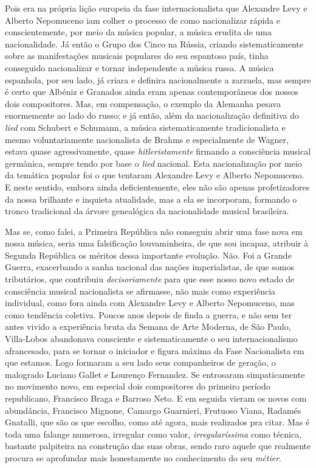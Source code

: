 Pois era na própria lição europeia da fase internacionalista que
Alexandre Levy e Alberto Nepomuceno iam colher o processo de como
nacionalizar rápida e conscientemente, por meio da música popular, a
música erudita de uma nacionalidade. Já então o Grupo dos Cinco na
Rússia, criando sistematicamente sobre as manifestações musicais
populares do seu espantoso país, tinha conseguido nacionalizar e tornar
independente a música russa. A música espanhola, por seu lado, já criara
e definira nacionalmente a zarzuela, mas sempre é certo que Albéniz e
Granados ainda eram apenas contemporâneos dos nossos dois compositores.
Mas, em compensação, o exemplo da Alemanha pesava enormemente ao lado do
russo; e já então, além da nacionalização definitiva do \textit{lied} com
Schubert e Schumann, a música sistematicamente tradicionalista e mesmo
voluntariamente nacionalista de Brahms e especialmente de Wagner, estava
quase agressivamente, quase \textit{hitleristamente} firmando a consciência
musical germânica, sempre tendo por base o \textit{lied} nacional. Esta
nacionalização por meio da temática popular foi o que tentaram Alexandre
Levy e Alberto Nepomuceno. E neste sentido, embora ainda
deficientemente, eles não são apenas profetizadores da nossa brilhante e
inquieta atualidade, mas a ela se incorporam, formando o tronco
tradicional da árvore genealógica da nacionalidade musical brasileira.

Mas se, como falei, a Primeira República não conseguiu abrir uma fase
nova em nossa música, seria uma falsificação louvaminheira, de que sou
incapaz, atribuir à Segunda República os méritos dessa importante
evolução. Não. Foi a Grande Guerra, exacerbando a sanha nacional das
nações imperialistas, de que somos tributários, que contribuiu
\textit{decisoriamente} para que esse nosso novo estado de consciência musical
nacionalista se afirmasse, não mais como experiência individual, como
fora ainda com Alexandre Levy e Alberto Nepomuceno, mas como tendência
coletiva. Poucos anos depois de finda a guerra, e não sem ter antes
vivido a experiência bruta da Semana de Arte Moderna, de São Paulo,
Villa-Lobos abandonava consciente e sistematicamente o seu
internacionalismo afrancesado, para se tornar o iniciador e figura
máxima da Fase Nacionalista em que estamos. Logo formaram a seu lado
seus companheiros de geração, o malogrado Luciano Gallet e Lourenço
Fernandez. Se entrosaram simpaticamente no movimento novo, em especial
dois compositores do primeiro período republicano, Francisco Braga e
Barroso Neto. E em seguida vieram os novos com abundância, Francisco
Mignone, Camargo Guarnieri, Frutuoso Viana, Radamés Gnatalli, que são os
que escolho, como até agora, mais realizados pra citar. Mas é toda uma
falange numerosa, irregular como valor, \textit{irregularíssima} como técnica,
bastante palpiteira na construção das suas obras, sendo raro aquele que
realmente procura se aprofundar mais honestamente no conhecimento do seu
\textit{métier}.

